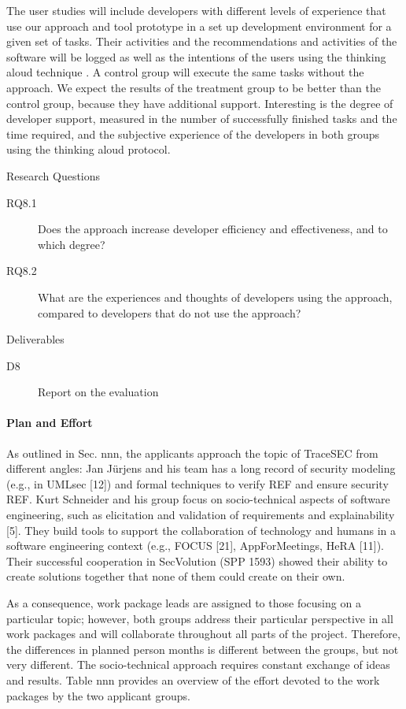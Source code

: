 The user studies will include developers with different levels of experience that use our approach and tool prototype in a set up development environment for a given set of tasks. Their activities and the recommendations and activities of the software will be logged as well as the intentions of the users using the thinking aloud technique \cite{thinkingAloud}. A control group will execute the same tasks without the approach. We expect the results of the treatment group to be better than the control group, because they have additional support. Interesting is the degree of developer support, measured in the number of successfully finished tasks and the time required, and the subjective experience of the developers in both groups using the thinking aloud protocol.

Research Questions
\begin{description}
	\item[RQ8.1]	Does the approach increase developer efficiency and effectiveness, and to which degree?
	\item[RQ8.2]	What are the experiences and thoughts of developers using the approach, compared to developers that do not use the approach?
\end{description}

Deliverables
\begin{description}
	\item[D8] Report on the evaluation
\end{description}

\paragraph*{Plan and Effort}
As outlined in Sec. nnn, the applicants approach the topic of TraceSEC from different angles: Jan Jürjens and his team has a long record of security modeling (e.g., in UMLsec [12]) and formal techniques to verify REF and ensure security REF. Kurt Schneider and his group focus on socio-technical aspects of software engineering, such as elicitation and validation of requirements and explainability [5]. They build tools to support the collaboration of technology and humans in a software engineering context (e.g., FOCUS [21], AppForMeetings, HeRA [11]). Their successful cooperation in SecVolution (SPP 1593) showed their ability to create solutions together that none of them could create on their own. 

As a consequence, work package leads are assigned to those focusing on a particular topic; however, both groups address their particular perspective in all work packages and will collaborate throughout all parts of the project. Therefore, the differences in planned person months is different between the groups, but not very different. The socio-technical approach requires constant exchange of ideas and results. Table nnn provides an overview of the effort devoted to the work packages by the two applicant groups. 

